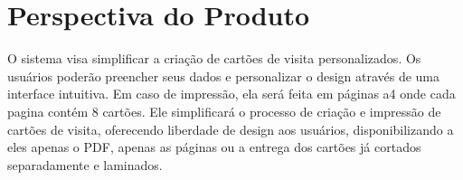 \section{Perspectiva do Produto}

O sistema visa simplificar a criação de cartões de visita personalizados. Os usuários poderão preencher seus dados e personalizar o design através de uma interface intuitiva. Em caso de impressão, ela será feita em páginas a4 onde cada pagina contém 8 cartões. Ele simplificará o processo de criação e impressão de cartões de visita, oferecendo liberdade de design aos usuários, disponibilizando a eles apenas o PDF, apenas as páginas ou a entrega dos cartões já cortados separadamente e laminados.
